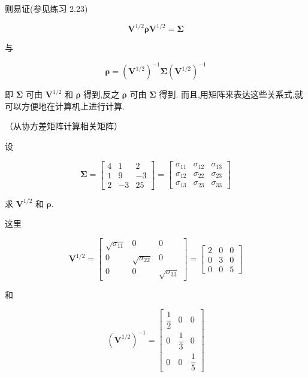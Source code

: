 
则易证(参见练习 2.23)

\label{eq:2-36}
\begin{equation}
\bm{V}^{1/2}\bm{\rho}\bm{V}^{1/2}=\bm{\Sigma} \tag{2-36}
\end{equation}

与

\label{eq:2-37}
\begin{equation}
\bm{\rho}=(\bm{V}^{1/2})^{-1}\bm{\Sigma}(\bm{V}^{1/2})^{-1} \tag{2-37}
\end{equation}

即 $\bm{\Sigma}$ 可由 $\bm{V}^{1/2}$ 和 $\bm{\rho}$ 得到,反之 $\bm{\rho}$ 可由 $\bm{\Sigma}$ 得到. 而且,用矩阵来表达这些关系式,就可以方便地在计算机上进行计算.

 （从协方差矩阵计算相关矩阵）

设

\[
\bm{\Sigma}=\begin{bmatrix}4 & 1 & 2\\1 & 9 & -3\\2 & -3 & 25\end{bmatrix}=\begin{bmatrix}\sigma_{11} & \sigma_{12} & \sigma_{13}\\\sigma_{12} & \sigma_{22} & \sigma_{23}\\\sigma_{13} & \sigma_{23} & \sigma_{33}\end{bmatrix}
\]

求 $\bm{V}^{1/2}$ 和 $\bm{\rho}$.

这里

\[
\bm{V}^{1/2}=\begin{bmatrix}\sqrt{\sigma_{11}} & 0 & 0\\0 & \sqrt{\sigma_{22}} & 0\\0 & 0 & \sqrt{\sigma_{33}}\end{bmatrix}=\begin{bmatrix}2 & 0 & 0\\0 & 3 & 0\\0 & 0 & 5\end{bmatrix}
\]

和

\[
(\bm{V}^{1/2})^{-1}=\begin{bmatrix}\dfrac{1}{2} & 0 & 0\\[2ex]0 & \dfrac{1}{3} & 0\\[2ex]0 & 0 & \dfrac{1}{5}\end{bmatrix}
\]


